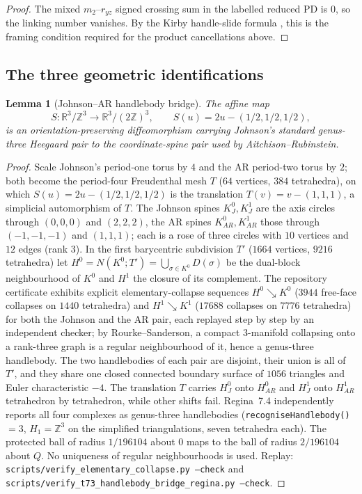 \documentclass[11pt]{amsart}
\newtheorem{lemma}[theorem]{Lemma}
\theoremstyle{definition}
\theoremstyle{remark}
\begin{document}
\begin{proof}
The mixed $m_2$--$r_{yz}$ signed crossing sum in the labelled reduced PD is
$0$, so the linking number vanishes.  By the Kirby handle-slide formula
\cite{Kirby1978}, this is the framing condition required for the product
cancellations above.
\end{proof}

\subsection{The three geometric identifications}

\begin{lemma}[Johnson--AR handlebody bridge]\label{lem:P0a}
The affine map
\[
S:\mathbb R^3/\mathbb Z^3\longrightarrow
\mathbb R^3/(2\mathbb Z)^3,\qquad
S(u)=2u-(1/2,1/2,1/2),
\]
is an orientation-preserving diffeomorphism carrying Johnson's standard
genus-three Heegaard pair to the coordinate-spine pair used by
Aitchison--Rubinstein.
\end{lemma}

\begin{proof}
Scale Johnson's period-one torus by $4$ and the AR period-two torus by $2$;
both become the period-four Freudenthal mesh $T$ ($64$ vertices, $384$
tetrahedra), on which $S(u)=2u-(1/2,1/2,1/2)$ is the translation
$T(v)=v-(1,1,1)$, a simplicial automorphism of $T$.  The Johnson spines
$K_J^0,K_J^1$ are the axis circles through $(0,0,0)$ and $(2,2,2)$, the AR
spines $K_{AR}^0,K_{AR}^1$ those through $(-1,-1,-1)$ and $(1,1,1)$; each is
a rose of three circles with $10$ vertices and $12$ edges (rank $3$).  In the
first barycentric subdivision $T'$ ($1664$ vertices, $9216$ tetrahedra) let
$H^0=N(K^0;T')=\bigcup_{\sigma\in K^0}D(\sigma)$ be the dual-block
neighbourhood of $K^0$ and $H^1$ the closure of its complement.  The
repository certificate exhibits explicit elementary-collapse sequences
$H^0\searrow K^0$ ($3944$ free-face collapses on $1440$ tetrahedra) and
$H^1\searrow K^1$ ($17688$ collapses on $7776$ tetrahedra) for both the
Johnson and the AR pair, each replayed step by step by an independent
checker; by Rourke--Sanderson, a compact $3$-manifold collapsing onto a
rank-three graph is a regular neighbourhood of it, hence a genus-three
handlebody.  The two handlebodies of each pair are disjoint, their union is
all of $T'$, and they share one closed connected boundary surface of $1056$
triangles and Euler characteristic $-4$.  The translation $T$ carries
$H_J^0$ onto $H_{AR}^0$ and $H_J^1$ onto $H_{AR}^1$ tetrahedron by
tetrahedron, while other shifts fail.  Regina~7.4 independently reports
all four complexes as genus-three handlebodies
(\texttt{recogniseHandlebody()}$=3$, $H_1=\mathbb Z^3$ on the simplified
triangulations, seven tetrahedra each).  The protected
ball of radius $1/196104$ about $0$ maps to the ball of radius $2/196104$
about $Q$.  No uniqueness of regular neighbourhoods is used.  Replay:
\texttt{scripts/verify\_elementary\_collapse.py --check} and
\texttt{scripts/verify\_t73\_handlebody\_bridge\_regina.py --check}.
\end{proof}
\end{document}
